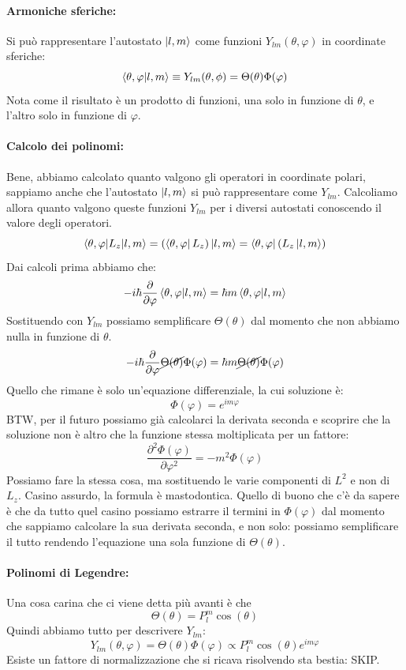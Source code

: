 \paragraph{Armoniche sferiche:}
Si può rappresentare l'autostato $\ket{l, m}$ come funzioni $Y_{lm}(\theta, \varphi)$ in coordinate sferiche:
$$\braket{\theta, \varphi | l, m} \equiv Y_{lm}(\theta, \phi) = \Theta(\theta)\Phi(\varphi)$$
Nota come il risultato è un prodotto di funzioni, una solo in funzione di $\theta$, e l'altro solo in funzione di $\varphi$.

\paragraph{Calcolo dei polinomi:} 
Bene, abbiamo calcolato quanto valgono gli operatori in coordinate polari, sappiamo anche che l'autostato $\ket{l, m}$ si può rappresentare come $Y_{lm}$. Calcoliamo allora quanto valgono queste funzioni $Y_{lm}$ per i diversi autostati conoscendo il valore degli operatori.
$$\braket{\theta, \varphi | L_z | l, m} = (\bra{\theta, \varphi}L_z)\ket{l, m} = \bra{\theta, \varphi}(L_z \ket{l, m})$$
Dai calcoli prima abbiamo che:
$$-i\hbar\frac{\partial}{\partial \varphi} \braket{\theta, \varphi|l, m} = \hbar m \braket{\theta, \varphi | l, m}$$
Sostituendo con $Y_{lm}$ possiamo semplificare $\Theta(\theta)$ dal momento che non abbiamo nulla in funzione di $\theta$.
$$-i\hbar\frac{\partial}{\partial \varphi} \cancel{\Theta(\theta)}\Phi(\varphi) = \hbar m \cancel{\Theta(\theta)}\Phi(\varphi)$$
Quello che rimane è solo un'equazione differenziale, la cui soluzione è:
$$\Phi(\varphi) = e^{im\varphi}$$
BTW, per il futuro possiamo già calcolarci la derivata seconda e scoprire che la soluzione non è altro che la funzione stessa moltiplicata per un fattore:
$$\frac{\partial^2 \Phi(\varphi)}{\partial \varphi^2} = -m^2\Phi (\varphi)$$
Possiamo fare la stessa cosa, ma sostituendo le varie componenti di $L^2$ e non di $L_z$.
Casino assurdo, la formula è mastodontica. Quello di buono che c'è da sapere è che da tutto quel casino possiamo estrarre il termini in $\Phi(\varphi)$ dal momento che sappiamo calcolare la sua derivata seconda, e non solo: possiamo semplificare il tutto rendendo l'equazione una sola funzione di $\Theta(\theta)$.

\paragraph{Polinomi di Legendre:}
Una cosa carina che ci viene detta più avanti è che 
$$\Theta(\theta) = P^m_l\cos(\theta)$$
Quindi abbiamo tutto per descrivere $Y_{lm}$:
$$Y_{lm}(\theta, \varphi) = \Theta(\theta)\Phi(\varphi) \propto P^m_l\cos(\theta)e^{im\varphi}$$
Esiste un fattore di normalizzazione che si ricava risolvendo sta bestia: SKIP.


